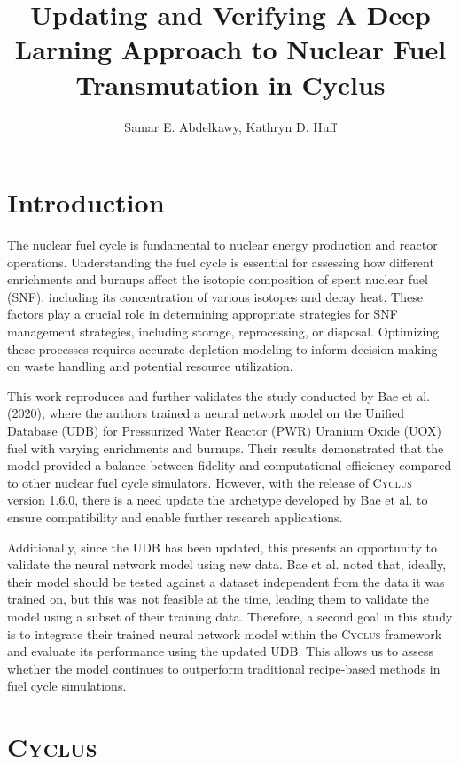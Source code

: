 \documentclass{anstrans}
\title{Updating and Verifying A Deep Larning Approach to Nuclear Fuel Transmutation in Cyclus}
\author{Samar E. Abdelkawy, Kathryn D. Huff}
\institute{
Advanced Reactors and Fuel Cycles Group, University of Illinois,
Urbana, IL, selsafy2@illinois.edu}
\newcommand{\cyclus}{\textsc{Cyclus}\xspace}
\begin{document}
\section{Introduction}
The nuclear fuel cycle is fundamental to nuclear energy production and reactor operations. Understanding the fuel cycle is essential for assessing how different enrichments and burnups affect the isotopic composition of spent nuclear fuel (SNF), including its concentration of various isotopes and decay heat. These factors play a crucial role in determining appropriate strategies for SNF management strategies, including storage, reprocessing, or disposal. Optimizing these processes requires accurate depletion modeling to inform decision-making on waste handling and potential resource utilization\cite{yacout_modeling_2005}.

This work reproduces and further validates the study conducted by Bae et al. (2020)\cite{bae_deep_2020}, where the authors trained a neural network model on the Unified Database (UDB) for Pressurized Water Reactor (PWR) Uranium Oxide (UOX) fuel with varying enrichments and burnups. Their results demonstrated that the model provided a balance between fidelity and computational efficiency compared to other nuclear fuel cycle simulators. However, with the release of \cyclus version 1.6.0, there is a need update the archetype developed by Bae et al. to ensure compatibility and enable further research applications.


Additionally, since the UDB has been updated, this presents an opportunity to validate the neural network model using new data. Bae et al. noted that, ideally, their model should be tested against a dataset independent from the data it was trained on, but this was not feasible at the time, leading them to validate the model using a subset of their training data. Therefore, a second goal in this study is to integrate their trained neural network model within the \cyclus framework and evaluate its performance using the updated UDB. This allows us to assess whether the model continues to outperform traditional recipe-based methods in fuel cycle simulations.




\section{\cyclus}
\end{document}
